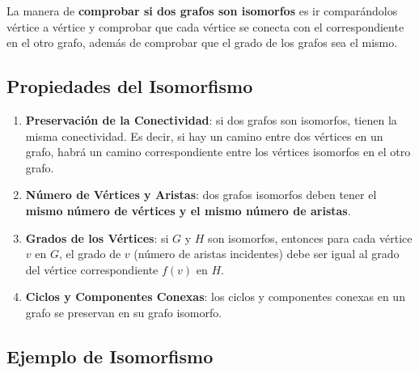 \documentclass{article}
\begin{document}
La manera de \textbf{comprobar si dos grafos son isomorfos} es ir comparándolos vértice a vértice y comprobar que cada vértice se conecta con el correspondiente en el otro grafo, además de comprobar que el grado de los grafos sea el mismo.

\subsection{Propiedades del Isomorfismo}

\begin{enumerate}
    \item \textbf{Preservación de la Conectividad}: si dos grafos son isomorfos, tienen la misma conectividad. Es decir, si hay un camino entre dos vértices en un grafo, habrá un camino correspondiente entre los vértices isomorfos en el otro grafo.

    \item \textbf{Número de Vértices y Aristas}: dos grafos isomorfos deben tener el \textbf{mismo número de vértices y el mismo número de aristas}.

    \item \textbf{Grados de los Vértices}: si $ G $ y $ H $ son isomorfos, entonces para cada vértice $ v $ en $ G $, el grado de $ v $ (número de aristas incidentes) debe ser igual al grado del vértice correspondiente $ f(v) $ en $ H $.

    \item \textbf{Ciclos y Componentes Conexas}: los ciclos y componentes conexas en un grafo se preservan en su grafo isomorfo.
\end{enumerate}

\subsection{Ejemplo de Isomorfismo}
\end{document}

